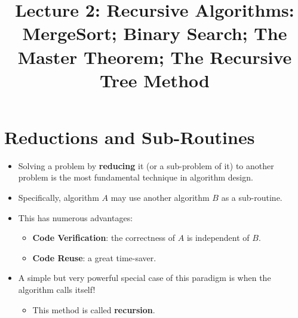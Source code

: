\documentclass[12pt]{article}
\title{\huge Lecture 2: Recursive Algorithms: MergeSort; Binary Search; The Master Theorem; The Recursive Tree Method}
\author{}
\date{}
\begin{document}
\maketitle
\section{Reductions and Sub-Routines}
\renewcommand{\labelitemii}{$\circ$}
\renewcommand{\labelitemiii}{$\cdot$}
\renewcommand{\labelitemiii}{$\rightarrow$}
\begin{itemize}
\item Solving a problem by \textbf{reducing} it (or a sub-problem of it) to another problem is the most fundamental technique in algorithm design.
\item Specifically, algorithm $A$ may use another algorithm $B$ as a sub-routine.
\item This has numerous advantages:
	\begin{itemize}
	\item \textbf{Code Verification}: the correctness of $A$ is independent of $B$.
	\item \textbf{Code Reuse}: a great time-saver.
	\end{itemize}
\item A simple but very powerful special case of this paradigm is when the algorithm calls itself!
	\begin{itemize}
	\item This method is called \textbf{recursion}.
	\end{itemize}
\end{itemize}
\end{document}

